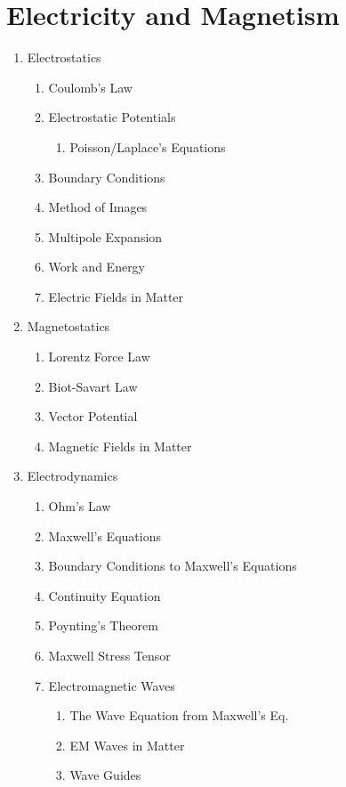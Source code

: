 \documentclass[12pt]{extarticle}
\begin{document}
\section{Electricity and Magnetism}
\begin{enumerate}
  \item{Electrostatics}
  \begin{enumerate}
    \item{Coulomb's Law}
    \item{Electrostatic Potentials}
    \begin{enumerate}
      \item{Poisson/Laplace's Equations}
    \end{enumerate}
    \item{Boundary Conditions}
    \item{Method of Images}
    \item{Multipole Expansion}
    \item{Work and Energy}
    \item{Electric Fields in Matter}
  \end{enumerate}
  \item{Magnetostatics}
  \begin{enumerate}
    \item{Lorentz Force Law}
    \item{Biot-Savart Law}
    \item{Vector Potential}
    \item{Magnetic Fields in Matter}
  \end{enumerate}
  \item{Electrodynamics}
  \begin{enumerate}
    \item{Ohm's Law}
    \item{Maxwell's Equations}
    \item{Boundary Conditions to Maxwell's Equations}
    \item{Continuity Equation}
    \item{Poynting's Theorem}
    \item{Maxwell Stress Tensor}
    \item{Electromagnetic Waves}
    \begin{enumerate}
      \item{The Wave Equation from Maxwell's Eq.}
      \item{EM Waves in Matter}
      \item{Wave Guides}
    \end{enumerate}
  \end{enumerate}

\end{enumerate}
\end{document}
